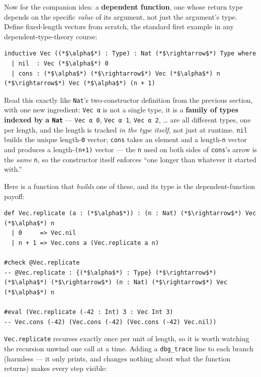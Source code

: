 Now for the companion idea: a \textbf{dependent function}, one whose return type depends on the specific \emph{value} of its argument, not just the argument's type. Define fixed-length vectors from scratch, the standard first example in any dependent-type-theory course:

\begin{lstlisting}
inductive Vec ((*$\alpha$*) : Type) : Nat (*$\rightarrow$*) Type where
  | nil  : Vec (*$\alpha$*) 0
  | cons : (*$\alpha$*) (*$\rightarrow$*) Vec (*$\alpha$*) n (*$\rightarrow$*) Vec (*$\alpha$*) (n + 1)
\end{lstlisting}

Read this exactly like \texttt{Nat}'s two-constructor definition from the previous section, with one new ingredient: \texttt{Vec α} is not a single type, it is a \textbf{family of types indexed by a \texttt{Nat}} --- \texttt{Vec α 0}, \texttt{Vec α 1}, \texttt{Vec α 2}, \ldots{} are all different types, one per length, and the length is tracked \emph{in the type itself}, not just at runtime. \texttt{nil} builds the unique length-\texttt{0} vector; \texttt{cons} takes an element and a length-\texttt{n} vector and produces a length-\texttt{(n+1)} vector --- the \texttt{n} used on both sides of \texttt{cons}'s arrow is the \emph{same} \texttt{n}, so the constructor itself enforces ``one longer than whatever it started with.''

Here is a function that \emph{builds} one of these, and its type is the dependent-function payoff:

\begin{lstlisting}
def Vec.replicate (a : (*$\alpha$*)) : (n : Nat) (*$\rightarrow$*) Vec (*$\alpha$*) n
  | 0     => Vec.nil
  | n + 1 => Vec.cons a (Vec.replicate a n)

#check @Vec.replicate
-- @Vec.replicate : {(*$\alpha$*) : Type} (*$\rightarrow$*) (*$\alpha$*) (*$\rightarrow$*) (n : Nat) (*$\rightarrow$*) Vec (*$\alpha$*) n

#eval (Vec.replicate (-42 : Int) 3 : Vec Int 3)
-- Vec.cons (-42) (Vec.cons (-42) (Vec.cons (-42) Vec.nil))
\end{lstlisting}

\texttt{Vec.replicate} recurses exactly once per unit of length, so it is worth watching the recursion unwind one call at a time. Adding a \texttt{dbg\_\allowbreak{}trace} line to each branch (harmless --- it only prints, and changes nothing about what the function returns) makes every step visible:

